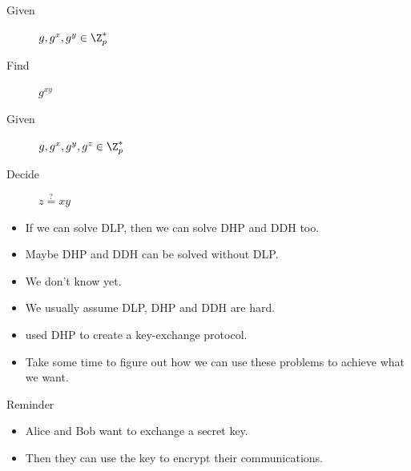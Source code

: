 \begin{frame}
  \begin{definition}
    \begin{description}
      \item[Given] \(g, g^x, g^y\in \Z_p^*\)
      \item[Find] \(g^{xy}\)
    \end{description}
  \end{definition}

  \pause{}
  
  \begin{definition}
    \begin{description}
      \item[Given] \(g, g^x, g^y, g^z\in \Z_p^*\)
      \item[Decide] \(z \stackrel{?}{=} xy\)
    \end{description}
  \end{definition}
\end{frame}

\begin{frame}
  \begin{itemize}
    \item If we can solve \ac{DLP}, then we can solve \ac{DHP} and \ac{DDH} 
      too.

      \pause{}

    \item Maybe \ac{DHP} and \ac{DDH} can be solved without \ac{DLP}.
    \item We don't know yet.

      \pause{}

    \item We usually assume \ac{DLP}, \ac{DHP} and \ac{DDH} are hard.
  \end{itemize}
\end{frame}

\begin{frame}
  \begin{exercise}
    \begin{itemize}
      \item \citeauthor{DiffieHellman} used 
        \ac{DHP} to create a key-exchange protocol.

        \pause{}

      \item Take some time to figure out how we can use these problems to 
        achieve what we want.
    \end{itemize}
  \end{exercise}

  \begin{block}{Reminder}
    \begin{itemize}
      \item Alice and Bob want to exchange a secret key.
      \item Then they can use the key to encrypt their communications.
    \end{itemize}
  \end{block}
\end{frame}

